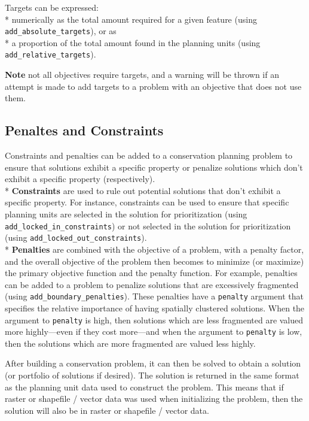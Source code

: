\documentclass[
  12pt,
]{book}
\begin{document}
Targets can be expressed:\\
* numerically as the total amount required for a given feature (using \texttt{add\_absolute\_targets}), or as\\
* a proportion of the total amount found in the planning units (using \texttt{add\_relative\_targets}).

\textbf{Note} not all objectives require targets, and a warning will be thrown if an attempt is made to add targets to a problem with an objective that does not use them.

\hypertarget{penaltes-and-constraints}{%
\subsection{Penaltes and Constraints}\label{penaltes-and-constraints}}

Constraints and penalties can be added to a conservation planning problem to ensure that solutions exhibit a specific property or penalize solutions which don't exhibit a specific property (respectively).\\
* \textbf{Constraints} are used to rule out potential solutions that don't exhibit a specific property. For instance, constraints can be used to ensure that specific planning units are selected in the solution for prioritization (using \texttt{add\_locked\_in\_constraints}) or not selected in the solution for prioritization (using \texttt{add\_locked\_out\_constraints}).\\
* \textbf{Penalties} are combined with the objective of a problem, with a penalty factor, and the overall objective of the problem then becomes to minimize (or maximize) the primary objective function and the penalty function. For example, penalties can be added to a problem to penalize solutions that are excessively fragmented (using \texttt{add\_boundary\_penalties}). These penalties have a \texttt{penalty} argument that specifies the relative importance of having spatially clustered solutions. When the argument to \texttt{penalty} is high, then solutions which are less fragmented are valued more highly---even if they cost more---and when the argument to \texttt{penalty} is low, then the solutions which are more fragmented are valued less highly.

After building a conservation problem, it can then be solved to obtain a solution (or portfolio of solutions if desired). The solution is returned in the same format as the planning unit data used to construct the problem. This means that if raster or shapefile / vector data was used when initializing the problem, then the solution will also be in raster or shapefile / vector data.
\end{document}
